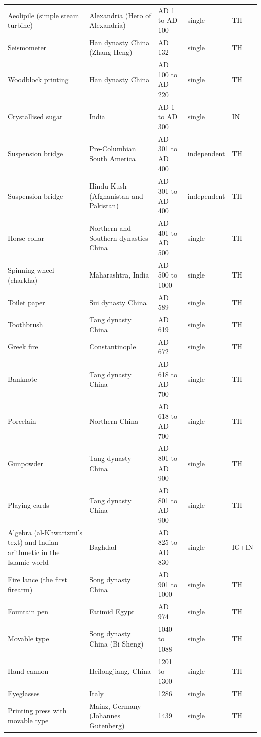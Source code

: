 \documentclass[11pt,a4paper]{article}
\begin{document}
\begin{longtable}{p{3.3cm}p{5.2cm}p{3.3cm}p{1.7cm}l}
Aeolipile (simple steam turbine) & Alexandria (Hero of Alexandria) & AD 1 to AD 100 & single & TH\\
Seismometer & Han dynasty China (Zhang Heng) & AD 132 & single & TH\\
Woodblock printing & Han dynasty China & AD 100 to AD 220 & single & TH\\
Crystallised sugar & India & AD 1 to AD 300 & single & IN\\
Suspension bridge & Pre-Columbian South America & AD 301 to AD 400 & independent & TH\\
Suspension bridge & Hindu Kush (Afghanistan and Pakistan) & AD 301 to AD 400 & independent & TH\\
Horse collar & Northern and Southern dynasties China & AD 401 to AD 500 & single & TH\\
Spinning wheel (charkha) & Maharashtra, India & AD 500 to 1000 & single & TH\\
Toilet paper & Sui dynasty China & AD 589 & single & TH\\
Toothbrush & Tang dynasty China & AD 619 & single & TH\\
Greek fire & Constantinople & AD 672 & single & TH\\
Banknote & Tang dynasty China & AD 618 to AD 700 & single & TH\\
Porcelain & Northern China & AD 618 to AD 700 & single & TH\\
Gunpowder & Tang dynasty China & AD 801 to AD 900 & single & TH\\
Playing cards & Tang dynasty China & AD 801 to AD 900 & single & TH\\
Algebra (al-Khwarizmi's text) and Indian arithmetic in the Islamic world & Baghdad & AD 825 to AD 830 & single & IG+IN\\
Fire lance (the first firearm) & Song dynasty China & AD 901 to 1000 & single & TH\\
Fountain pen & Fatimid Egypt & AD 974 & single & TH\\
Movable type & Song dynasty China (Bi Sheng) & 1040 to 1088 & single & TH\\
Hand cannon & Heilongjiang, China & 1201 to 1300 & single & TH\\
Eyeglasses & Italy & 1286 & single & TH\\
Printing press with movable type & Mainz, Germany (Johannes Gutenberg) & 1439 & single & TH\\
\bottomrule\end{longtable}\normalsize
\end{document}
